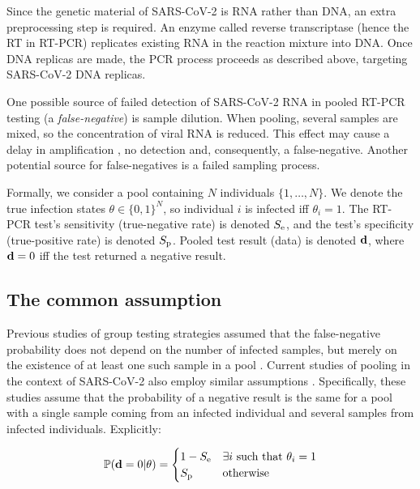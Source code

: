 \documentclass{article}
\begin{document}
Since the genetic material of SARS-CoV-2 is RNA rather than DNA, an
extra preprocessing step is required. An enzyme called reverse
transcriptase (hence the RT in RT-PCR) replicates existing RNA in the
reaction mixture into DNA. Once DNA replicas are made, the PCR process
proceeds as described above, targeting SARS-CoV-2 DNA replicas.

One possible source of failed detection of SARS-CoV-2 RNA in pooled
RT-PCR testing (a \emph{false-negative}) is sample dilution. When
pooling, several samples are mixed, so the concentration of viral RNA
is reduced. This effect may cause a delay in amplification
\cite{DorfmanYuvalDor}, no detection and, consequently, a
false-negative. Another potential source for false-negatives is a
failed sampling process. 


Formally, we consider a pool containing $N$ individuals
$\{1,\dots,N\}$. We denote the true infection states $\theta \in
\{0,1\}^N$, so individual $i$ is infected iff $\theta_i=1$. The RT-PCR
test's sensitivity (true-negative rate) is denoted $S_{\text{e}}$, and the
test's specificity (true-positive rate) is denoted $S_{\text{p}}$. Pooled
test result (data) is denoted $\mathbf{d}$, where $\mathbf{d}=0$ iff the test
returned a negative result.

\subsection{The common assumption}\label{subsec:common}
Previous studies of group testing strategies assumed that the
false-negative probability does not depend on the number of infected
samples, but merely on the existence of at least one such sample in a
pool \cite{Kim, OptimalDorfmanPool}. Current studies of pooling in the
context of SARS-CoV-2 also employ similar assumptions
\cite{Simplistic1, Simplistic2}. Specifically, these studies assume
that the probability of a negative result is the same for a pool with
a single sample coming from an infected individual and several
 samples from infected individuals. Explicitly:

\begin{align}\label{eq:common}
  \mathbb{P}(\mathbf{d}=0|\theta) = 
  \begin{cases} 
    1-S_{\text{e}} & \exists i\ \text{such that } \theta_i = 1\\
    S_{\text{p}} & \text{otherwise}
  \end{cases} 
\end{align}
\end{document}
